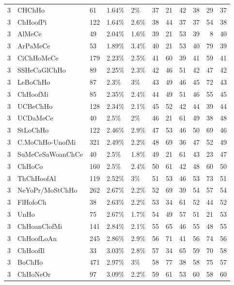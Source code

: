 \begin{longtable}{lllllrrrrrr}
  3 & CHChHo & 61 & 1.64\% & 2\% &  37 &  21 &  42 &  38 &  29 &  37 \\ 
  3 & ChHoofPi & 122 & 1.64\% & 2.6\% &  38 &  44 &  37 &  37 &  54 &  38 \\ 
  3 & AlMeCe & 49 & 2.04\% & 1.6\% &  39 &  21 &  53 &  39 &   8 &  40 \\ 
  3 & ArPaMeCe & 53 & 1.89\% & 3.4\% &  40 &  21 &  53 &  40 &  79 &  39 \\ 
  3 & CiChHoMeCe & 179 & 2.23\% & 2.5\% &  41 &  60 &  39 &  41 &  59 &  41 \\ 
  3 & SSHeCaGlChHo & 89 & 2.25\% & 2.3\% &  42 &  46 &  51 &  42 &  47 &  42 \\ 
  3 & LeBoChHo & 87 & 2.3\% & 3\% &  43 &  49 &  46 &  45 &  72 &  43 \\ 
  3 & ChHoofMi & 85 & 2.35\% & 2.4\% &  44 &  49 &  51 &  46 &  55 &  45 \\ 
  3 & UCBeChHo & 128 & 2.34\% & 2.1\% &  45 &  52 &  42 &  44 &  39 &  44 \\ 
  3 & UCDaMeCe & 40 & 2.5\% & 2\% &  46 &  21 &  61 &  49 &  38 &  48 \\ 
  3 & StLoChHo & 122 & 2.46\% & 2.9\% &  47 &  53 &  46 &  50 &  69 &  46 \\ 
  3 & C.MoChHo-UnofMi & 321 & 2.49\% & 2.2\% &  48 &  69 &  36 &  47 &  52 &  49 \\ 
  3 & SuMeCeSaWoanChCe & 40 & 2.5\% & 1.8\% &  49 &  21 &  61 &  43 &  23 &  47 \\ 
  3 & ChHoCo & 160 & 2.5\% & 2.4\% &  50 &  61 &  42 &  48 &  60 &  50 \\ 
  3 & ThChHoofAl & 119 & 2.52\% & 3\% &  51 &  53 &  46 &  53 &  73 &  51 \\ 
  3 & NeYoPr/MoStChHo & 262 & 2.67\% & 2.2\% &  52 &  69 &  39 &  54 &  57 &  54 \\ 
  3 & FlHofoCh & 38 & 2.63\% & 2.2\% &  53 &  34 &  61 &  52 &  44 &  52 \\ 
  3 & UnHo & 75 & 2.67\% & 1.7\% &  54 &  49 &  57 &  51 &  21 &  53 \\ 
  3 & ChHoanClofMi & 141 & 2.84\% & 2.1\% &  55 &  65 &  46 &  55 &  48 &  55 \\ 
  3 & ChHoofLoAn & 245 & 2.86\% & 2.9\% &  56 &  71 &  41 &  56 &  74 &  56 \\ 
  3 & ChHoofIl & 33 & 3.03\% & 2.8\% &  57 &  34 &  65 &  59 &  70 &  58 \\ 
  3 & BoChHo & 471 & 2.97\% & 3\% &  58 &  77 &  38 &  58 &  75 &  57 \\ 
  3 & ChHoNeOr & 97 & 3.09\% & 2.2\% &  59 &  61 &  53 &  60 &  58 &  60 \\ 

\end{longtable}

